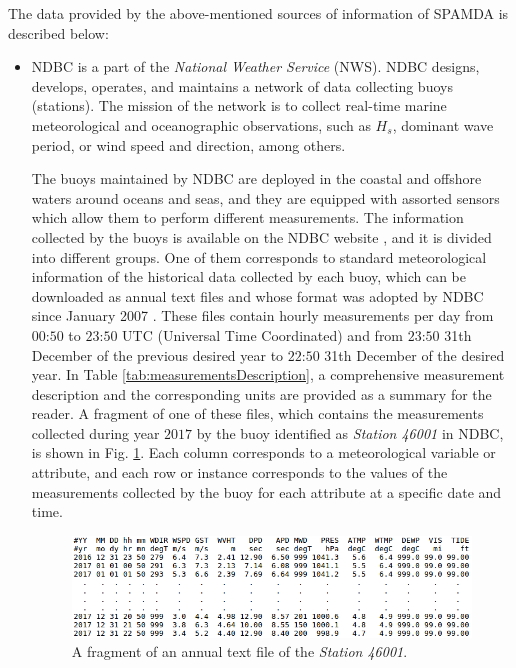 \documentclass[review]{elsarticle}
\begin{document}
		The data provided by the above-mentioned sources of information of SPAMDA is described below:
		
		\begin{itemize}
			
			\item NDBC is a part of the \textit{National Weather Service} (NWS). NDBC designs, develops, operates, and maintains a network of data collecting buoys (stations). The mission of the network is to collect real-time marine meteorological and oceanographic observations, such as $H_s$, dominant wave period, or wind speed and direction, among others.

			The buoys maintained by NDBC are deployed in the coastal and offshore waters around oceans and seas, and they are equipped with assorted sensors which allow them to perform different measurements. The information collected by the buoys is available on the NDBC website \cite{NOAA_1}, and it is divided into different groups. One of them corresponds to standard meteorological information of the historical data collected by each buoy, which can be downloaded as annual text files and whose format was adopted by NDBC since January 2007 \cite {NOAA_2}. These files contain hourly measurements per day from $00$:$50$ to $23$:$50$ UTC (Universal Time Coordinated) and from $23$:$50$ 31th December of the previous desired year to $22$:$50$ 31th December of the desired year. In Table \ref{tab:measurementsDescription}, a comprehensive measurement description and the corresponding units are provided as a summary for the reader. A fragment of one of these files, which contains the measurements collected during year $2017$ by the buoy identified as \textit{Station 46001} in NDBC, is shown in Fig. \ref{fig:fragmentAnnualTexFile}. Each column corresponds to a meteorological variable or attribute, and each row or instance corresponds to the values of the measurements collected by the buoy for each attribute at a specific date and time.

			\begin{figure}[ht!]
				\centering
				\includegraphics[scale=0.50]{figures/FigureFragmentAnnualTextFile.png}
				\caption{A fragment of an annual text file of the \textit{Station 46001}.}
				\label{fig:fragmentAnnualTexFile}
			\end{figure}
			

\end{itemize}
\end{document}
